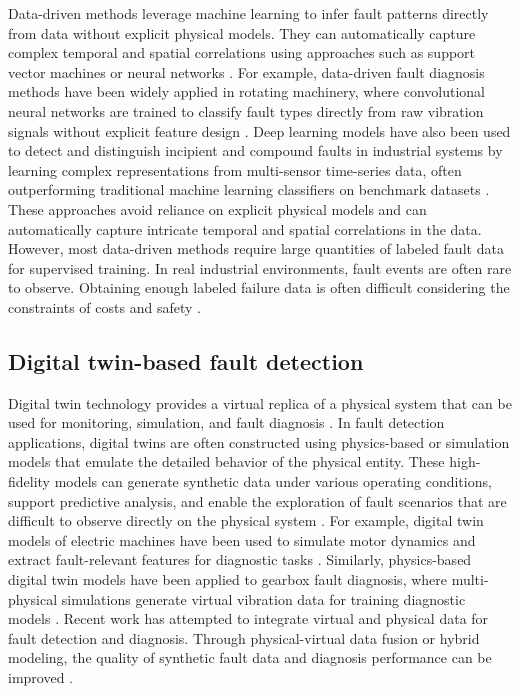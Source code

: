 \documentclass[a4paper,10pt]{cas-sc}%
\begin{document}
Data-driven methods leverage machine learning to infer fault patterns directly from data without explicit physical models. They can automatically capture complex temporal and spatial correlations using approaches such as support vector machines or neural networks \citep{sahu2024data, dai2013model, chen2023review, calabrese2022data}. For example, data-driven fault diagnosis methods have been widely applied in rotating machinery, where convolutional neural networks are trained to classify fault types directly from raw vibration signals without explicit feature design \citep{SOUZA2021107060}. Deep learning models have also been used to detect and distinguish incipient and compound faults in industrial systems by learning complex representations from multi-sensor time-series data, often outperforming traditional machine learning classifiers on benchmark datasets \citep{neupane2025data}. These approaches avoid reliance on explicit physical models and can automatically capture intricate temporal and spatial correlations in the data. However, most data-driven methods require large quantities of labeled fault data for supervised training. In real industrial environments, fault events are often rare to observe. Obtaining enough labeled failure data is often difficult considering the constraints of costs and safety \citep{neupane2025data, ramirez2023semi, saeed2025deep}.


\subsection{Digital twin-based fault detection}\label{sect:2.2}



Digital twin technology provides a virtual replica of a physical system that can be used for monitoring, simulation, and fault diagnosis \citep{javaid2023digital,ZHONG2023e14534}. In fault detection applications, digital twins are often constructed using physics-based or simulation models that emulate the detailed behavior of the physical entity. These high-fidelity models can generate synthetic data under various operating conditions, support predictive analysis, and enable the exploration of fault scenarios that are difficult to observe directly on the physical system \citep{lopes2024synthetic, van2022predictive}. For example, digital twin models of electric machines have been used to simulate motor dynamics and extract fault-relevant features for diagnostic tasks \citep{hu2025research}. Similarly, physics-based digital twin models have been applied to gearbox fault diagnosis, where multi-physical simulations generate virtual vibration data for training diagnostic models \citep{xia2023novel}. Recent work has attempted to integrate virtual and physical data for fault detection and diagnosis. Through physical-virtual data fusion or hybrid modeling, the quality of synthetic fault data and diagnosis performance can be improved \citep{xia2023novel,xia2024digital}.
\end{document}
